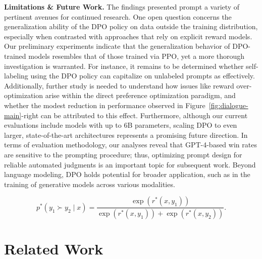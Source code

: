 \textbf{Limitations \& Future Work.} The findings presented prompt a variety of pertinent avenues for continued research. One open question concerns the generalization ability of the DPO policy on data outside the training distribution, especially when contrasted with approaches that rely on explicit reward models. Our preliminary experiments indicate that the generalization behavior of DPO-trained models resembles that of those trained via PPO, yet a more thorough investigation is warranted. For instance, it remains to be determined whether self-labeling using the DPO policy can capitalize on unlabeled prompts as effectively. Additionally, further study is needed to understand how issues like reward over-optimization arise within the direct preference optimization paradigm, and whether the modest reduction in performance observed in Figure~\ref{fig:dialogue-main}-right can be attributed to this effect. Furthermore, although our current evaluations include models with up to 6B parameters, scaling DPO to even larger, state-of-the-art architectures represents a promising future direction. In terms of evaluation methodology, our analyses reveal that GPT-4-based win rates are sensitive to the prompting procedure; thus, optimizing prompt design for reliable automated judgments is an important topic for subsequent work. Beyond language modeling, DPO holds potential for broader application, such as in the training of generative models across various modalities.

\begin{equation}\label{eq:bradley-terry}
    p^*(y_1\succ y_2 \mid x)=\frac{\exp\left(r^*(x, y_1)\right)}{\exp\left(r^*(x, y_1)\right) + \exp\left(r^*(x, y_2)\right)}.
\end{equation}

\section{Related Work}

